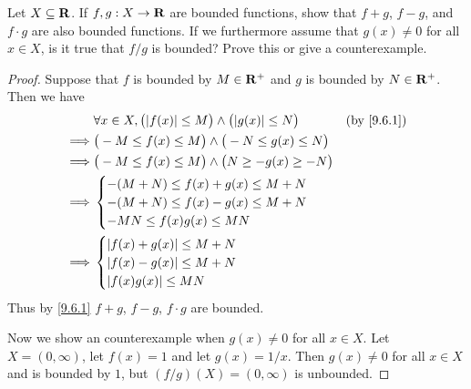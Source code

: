 \begin{exercise}\label{ex 9.6.2}
  Let \(X \subseteq \mathbf{R}\).
  If \(f, g: X \to \mathbf{R}\) are bounded functions, show that \(f + g\), \(f - g\), and \(f \cdot g\) are also bounded functions.
  If we furthermore assume that \(g(x) \neq 0\) for all \(x \in X\), is it true that \(f / g\) is bounded?
  Prove this or give a counterexample.
\end{exercise}

\begin{proof}
  Suppose that \(f\) is bounded by \(M \in \mathbf{R}^+\) and \(g\) is bounded by \(N \in \mathbf{R}^+\).
  Then we have
  \begin{align*}
             & \forall x \in X, \big(\abs{f(x)} \leq M\big) \land \big(\abs{g(x)} \leq N\big) & \text{(by \cref{9.6.1})} \\
    \implies & \big(-M \leq f(x) \leq M\big) \land \big(-N \leq g(x) \leq N\big)                                         \\
    \implies & \big(-M \leq f(x) \leq M\big) \land \big(N \geq -g(x) \geq -N\big)                                        \\
    \implies & \begin{cases}
                 -(M + N) \leq f(x) + g(x) \leq M + N \\
                 -(M + N) \leq f(x) - g(x) \leq M + N \\
                 -MN \leq f(x) g(x) \leq MN
               \end{cases}                                                                      \\
    \implies & \begin{cases}
                 \abs{f(x) + g(x)} \leq M + N \\
                 \abs{f(x) - g(x)} \leq M + N \\
                 \abs{f(x) g(x)} \leq MN
               \end{cases}
  \end{align*}
  Thus by \cref{9.6.1} \(f + g\), \(f - g\), \(f \cdot g\) are bounded.

  Now we show an counterexample when \(g(x) \neq 0\) for all \(x \in X\).
  Let \(X = (0, \infty)\), let \(f(x) = 1\) and let \(g(x) = 1 / x\).
  Then \(g(x) \neq 0\) for all \(x \in X\) and is bounded by \(1\), but \((f / g)(X) = (0, \infty)\) is unbounded.
\end{proof}